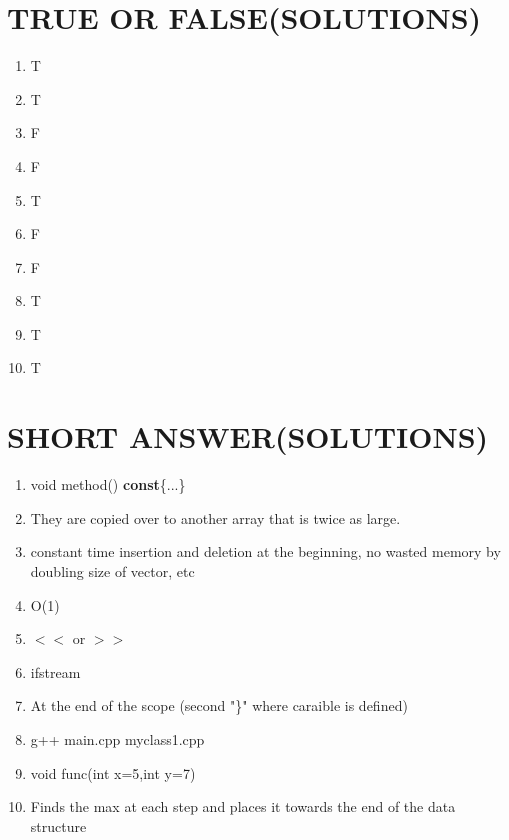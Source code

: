 \documentclass[a4paper]{article}
\begin{document}
\section{TRUE OR FALSE(SOLUTIONS)}
\begin{enumerate}
    \item T
    \item T
    \item F
    \item F
    \item T
    \item F
    \item F
    \item T
    \item T
    \item T
\end{enumerate}

\section{SHORT ANSWER(SOLUTIONS)}
\begin{enumerate}
    \item void method() \textbf{const}\{...\}
    \item They are copied over to another array that is twice as large.
    \item constant time insertion and deletion at the beginning, no wasted memory by doubling size of vector, etc
    \item O(1)
    \item $<<$ or $>>$
    \item ifstream
    \item At the end of the scope (second "\}" where caraible is defined)
    \item g++ main.cpp myclass1.cpp
    \item void func(int x=5,int y=7)
    \item Finds the max at each step and places it towards the end of the data structure
\end{enumerate}
\newpage
\end{document}

